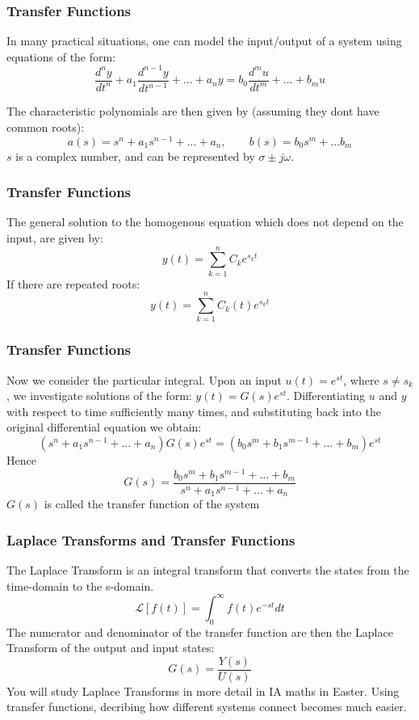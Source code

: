 \documentclass{beamer}
\begin{document}
\begin{frame}
\frametitle{Transfer Functions}
In many practical situations, one can model the input/output of a system using equations of the form: 
\begin{equation}
\frac{d^n y}{dt^n} + a_1 \frac{d^{n-1} y}{d t^{n-1}} + \dots + a_n y = b_0 \frac{d^m u}{d t^m} + \dots + b_m u
\end{equation}

The characteristic polynomials are then given by (assuming they dont have common roots): 
\begin{equation}
    a(s) = s^n + a_1 s^{n-1} + \dots + a_n, \qquad b(s) = b_0 s^m + \dots b_m
\end{equation}
$s$ is a complex number, and can be represented by $\sigma \pm j \omega$. 
\end{frame}

\begin{frame}
\frametitle{Transfer Functions}
The general solution to the homogenous equation which does not depend on the input, are given by: 
\begin{equation}
    y(t) = \sum_{k=1}^{n} C_k e^{s_k t}
\end{equation}
If there are repeated roots: 
\begin{equation}
    y(t) = \sum_{k=1}^{n} C_k(t) e^{s_k t}
\end{equation}
\end{frame}

\begin{frame}
\frametitle{Transfer Functions}
Now we consider the particular integral. 
\newline
Upon an input $u(t) = e^{st}$, where $s \neq s_k$, we investigate solutions of the form: 
$y(t) = G(s)e^{st}$.
Differentiating $u$ and $y$ with respect to time sufficiently many times, and substituting back into the original differential equation we obtain: 
\begin{equation}
    (s^n + a_1 s^{n-1} + \dots + a_n) G(s) e^{st} = (b_0 s^m + b_1 s^{m-1} + \dots + b_m) e^{st}
\end{equation}
Hence
\begin{equation}
    G(s) = \frac{b_0 s^m + b_1 s^{m-1} + \dots + b_m}{s^n + a_1 s^{n-1} + \dots + a_n}
\end{equation}
$G(s)$ is called the transfer function of the system
\end{frame}

\begin{frame}
\frametitle{Laplace Transforms and Transfer Functions}
The Laplace Transform is an integral transform that converts the states from the time-domain to the s-domain. 
\begin{equation}
    \mathcal{L}[f(t)] = \int_{0}^{\infty} f(t) e^{-st} dt
\end{equation}
The numerator and denominator of the transfer function are then the Laplace Transform of the output and input states:
\begin{equation}
    G(s) = \frac{Y(s)}{U(s)}
\end{equation}
You will study Laplace Transforms in more detail in IA maths in Easter. 
Using transfer functions, decribing how different systems connect becomes much easier. 
\end{frame}
\end{document}
